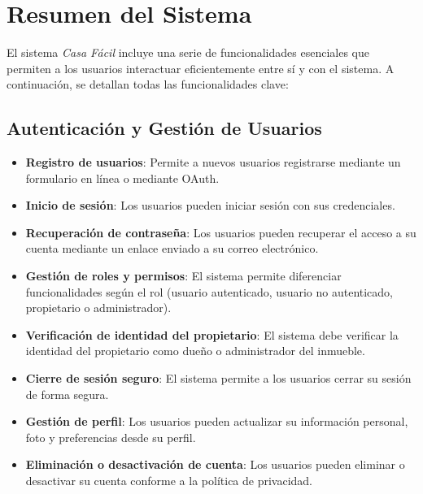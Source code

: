 \section{Resumen del Sistema}
	\noindent El sistema \textit{Casa Fácil} incluye una serie de funcionalidades esenciales que permiten a los usuarios interactuar eficientemente entre sí y con el sistema. A continuación, se detallan todas las funcionalidades clave:
	
	\subsection*{Autenticación y Gestión de Usuarios}
		\begin{itemize}
			\item \textbf{Registro de usuarios}: Permite a nuevos usuarios registrarse mediante un formulario en línea o mediante OAuth.
			\item \textbf{Inicio de sesión}: Los usuarios pueden iniciar sesión con sus credenciales.
			\item \textbf{Recuperación de contraseña}: Los usuarios pueden recuperar el acceso a su cuenta mediante un enlace enviado a su correo electrónico.
			\item \textbf{Gestión de roles y permisos}: El sistema permite diferenciar funcionalidades según el rol (usuario autenticado, usuario no autenticado, propietario o administrador).
			\item \textbf{Verificación de identidad del propietario}: El sistema debe verificar la identidad del propietario como dueño o administrador del inmueble.
			\item \textbf{Cierre de sesión seguro}: El sistema permite a los usuarios cerrar su sesión de forma segura.
			\item \textbf{Gestión de perfil}: Los usuarios pueden actualizar su información personal, foto y preferencias desde su perfil.
			\item \textbf{Eliminación o desactivación de cuenta}: Los usuarios pueden eliminar o desactivar su cuenta conforme a la política de privacidad.
		\end{itemize}
	
